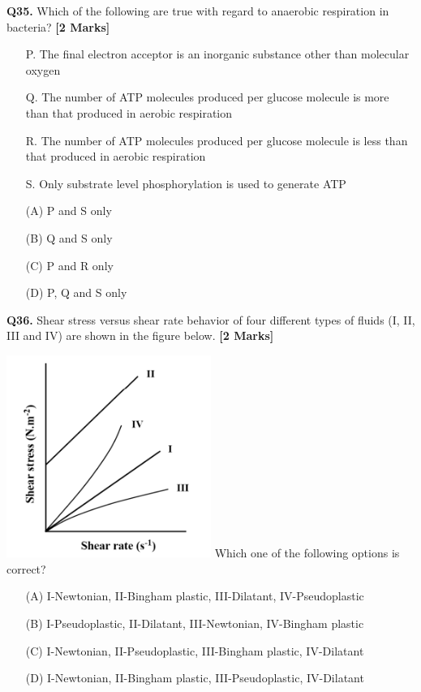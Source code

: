 \documentclass[11pt]{article}
\newcommand{\questionb}[2]{
    \noindent\textbf{Q#2.} #1 \hfill \textbf{[2 Marks]}
}
\begin{document}
\questionb{Which of the following are true with regard to anaerobic respiration in bacteria?}{35}
\begin{enumerate}
    \item[P.] The final electron acceptor is an inorganic substance other than molecular oxygen
    \item[Q.] The number of ATP molecules produced per glucose molecule is more than that produced in aerobic respiration
    \item[R.] The number of ATP molecules produced per glucose molecule is less than that produced in aerobic respiration
    \item[S.] Only substrate level phosphorylation is used to generate ATP
    \item[(A)] P and S only
    \item[(B)] Q and S only
    \item[(C)] P and R only
    \item[(D)] P, Q and S only
\end{enumerate}
\vspace{0.5cm}

\questionb{Shear stress versus shear rate behavior of four different types of fluids (I, II, III and IV) are shown in the figure below.}{36}
\includegraphics[width=0.5\textwidth]{figures/Q36}
Which one of the following options is correct?
\begin{enumerate}
    \item[(A)] I-Newtonian, II-Bingham plastic, III-Dilatant, IV-Pseudoplastic
    \item[(B)] I-Pseudoplastic, II-Dilatant, III-Newtonian, IV-Bingham plastic
    \item[(C)] I-Newtonian, II-Pseudoplastic, III-Bingham plastic, IV-Dilatant
    \item[(D)] I-Newtonian, II-Bingham plastic, III-Pseudoplastic, IV-Dilatant
\end{enumerate}
\vspace{0.5cm}
\end{document}
